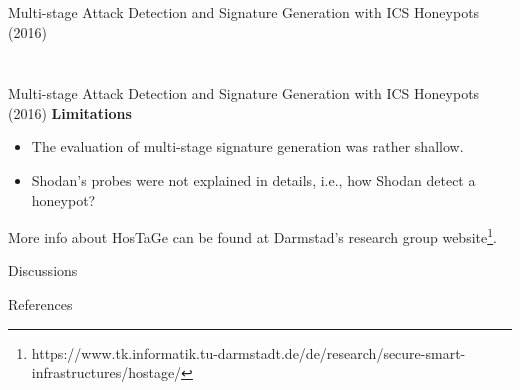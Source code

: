 \documentclass[compress]{beamer}
\begin{document}
\begin{frame}{Multi-stage Attack Detection and Signature Generation with ICS Honeypots (2016)}
\begin{columns}
\begin{column}{0.45\textwidth}
\begin{figure}
      \label{fig:hostage-ip-sources}
      \end{figure}
     \end{column}
    \end{columns}
\end{frame}
\begin{frame}{Multi-stage Attack Detection and Signature Generation with ICS Honeypots (2016)}
    \textbf{Limitations}
    \begin{itemize}
     \item The evaluation of multi-stage signature generation was rather shallow.
     \item Shodan's probes were not explained in details, i.e., how Shodan detect a honeypot?
    \end{itemize}
    More info about HosTaGe can be found at Darmstad's research group website\footnote{https://www.tk.informatik.tu-darmstadt.de/de/research/secure-smart-infrastructures/hostage/}.
\end{frame}

\begin{frame}{Discussions}
\end{frame}

\begin{frame}[allowframebreaks]{References}\tiny{
\def\newblock{}

}
\end{frame}
\end{document}
